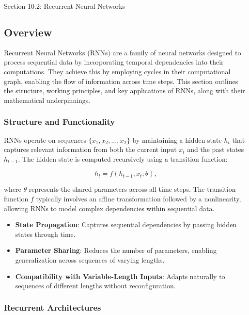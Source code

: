 \begin{notes}{Section 10.2: Recurrent Neural Networks}
    \subsection*{Overview}

    Recurrent Neural Networks (RNNs) are a family of neural networks designed to process sequential data by incorporating temporal dependencies into their computations. They achieve this by employing cycles 
    in their computational graph, enabling the flow of information across time steps. This section outlines the structure, working principles, and key applications of RNNs, along with their mathematical 
    underpinnings.
    
    \subsubsection*{Structure and Functionality}
    
    RNNs operate on sequences $\{x_1, x_2, \dots, x_T\}$ by maintaining a hidden state $h_t$ that captures relevant information from both the current input $x_t$ and the past states $h_{t-1}$. 
    The hidden state is computed recursively using a transition function:
    
    \[
    h_t = f(h_{t-1}, x_t; \theta),
    \]
    
    where $\theta$ represents the shared parameters across all time steps. The transition function $f$ typically involves an affine transformation followed by a nonlinearity, allowing RNNs to model 
    complex dependencies within sequential data.
    
    \begin{highlight}
        \begin{itemize}
            \item \textbf{State Propagation}: Captures sequential dependencies by passing hidden states through time.
            \item \textbf{Parameter Sharing}: Reduces the number of parameters, enabling generalization across sequences of varying lengths.
            \item \textbf{Compatibility with Variable-Length Inputs}: Adapts naturally to sequences of different lengths without reconfiguration.
        \end{itemize}
    \end{highlight}
    
    \subsubsection*{Recurrent Architectures}
    

\end{notes}
